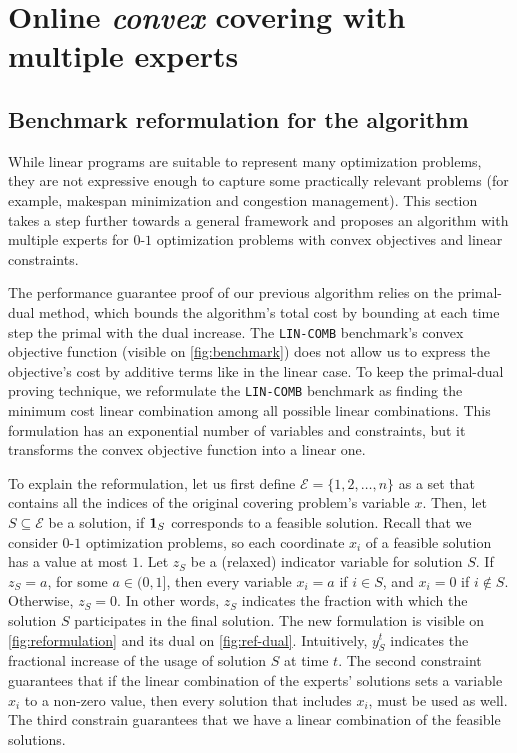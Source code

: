 
\section{Online \emph{convex} covering with multiple experts} \label{sec:convex}

\subsection{Benchmark reformulation for the algorithm}

While linear programs are suitable to represent many optimization problems, they are not expressive enough to capture some practically relevant problems (for example, makespan minimization and congestion management). This section takes a step further towards a general framework and proposes an algorithm with multiple experts for $0$-$1$ optimization problems with convex objectives and linear constraints.

The performance guarantee proof of our previous algorithm relies on the primal-dual method, which bounds the algorithm's total cost by bounding at each time step the primal with the dual increase.
The \texttt{LIN-COMB} benchmark's convex objective function (visible on \cref{fig:benchmark}) does not allow us to express the objective's cost by additive terms like in the linear case. To keep the primal-dual proving technique, we reformulate the \texttt{LIN-COMB} benchmark as finding the minimum cost linear combination among all possible linear combinations. This formulation has an exponential number of variables and constraints, but it transforms the convex objective function into a linear one.

To explain the reformulation, let us first define $\mathcal{E} = \{1,2,\dots,n\}$ as a set that contains all the indices of the original covering problem's variable $x$. Then, let $S \subseteq \mathcal{E}$ be a solution, if $\mathbf{1}_{S}$ corresponds to a feasible solution. Recall that we consider $0$-$1$ optimization problems, so each coordinate $x_i$ of a feasible solution has a value at most $1$. Let $z_{S}$ be a (relaxed) indicator variable for solution $S$. If $z_{S} = a$, for some $a \in (0,1]$, then every variable $x_{i} = a$ if $i \in S$, and $x_{i} = 0$ if $i \notin S$. Otherwise, $z_S = 0$. In other words, $z_{S}$ indicates the fraction with which the solution $S$ participates in the final solution. The new formulation is visible on \cref{fig:reformulation} and its dual on \cref{fig:ref-dual}. Intuitively, $y_S^{t}$ indicates the fractional increase of the usage of solution $S$ at time $t$. The second constraint guarantees that if the linear combination of the experts' solutions sets a variable $x_i$ to a non-zero value, then every solution that includes $x_i$, must be used as well. The third constrain guarantees that we have a linear combination of the feasible solutions.

